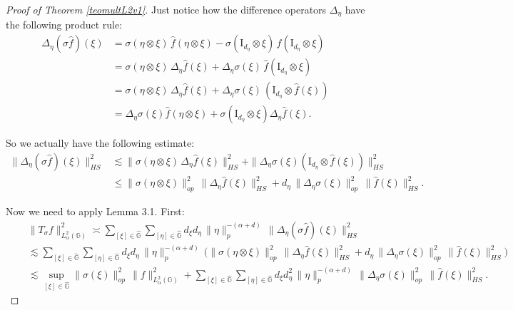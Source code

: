 \documentclass[12pt, reqno]{amsart}
\newcommand{\1}{\mathds{1}}
\begin{document}
\begin{proof}[Proof of Theorem \ref{teomultL2v1}]
    Just notice how the difference operators $\Delta_\eta$ have the following product rule:
\begin{align*}
\Delta_\eta (\sigma\widehat{ f})(\xi) 
&= \sigma(\eta \otimes \xi)\,\hat{f}(\eta \otimes \xi) 
   - \sigma(\mathrm{I}_{d_\eta} \otimes \xi)\,\hat{f}(\mathrm{I}_{d_\eta} \otimes \xi) \\
&= \sigma(\eta \otimes \xi)\,\Delta_\eta \hat{f}(\xi) 
   + \Delta_\eta \sigma(\xi)\,\hat{f}(\mathrm{I}_{d_\eta} \otimes \xi) \\
&= \sigma(\eta \otimes \xi)\,\Delta_\eta \hat{f}(\xi) 
   + \Delta_\eta \sigma(\xi)\,(\mathrm{I}_{d_\eta} \otimes \hat{f}(\xi)) \\ &= \Delta_\eta \sigma (\xi) \widehat{f}(\eta \otimes \xi) + \sigma (\mathrm{I}_{d_\eta} \otimes \xi ) \Delta_\eta \widehat{f} (\xi ).
\end{align*}

So we actually have the following estimate:
\begin{align*}
\|\Delta_\eta (\sigma\widehat{ f})(\xi)\|^2_{HS} 
&\lesssim 
\|\sigma(\eta \otimes \xi)\,\Delta_\eta \hat{f}(\xi)\|^2_{HS} 
+ \|\Delta_\eta \sigma(\xi)(\mathrm{I}_{d_\eta} \otimes \hat{f}(\xi))\|^2_{HS} \\
&\leq \|\sigma(\eta \otimes \xi)\|^2_{op}\,\|\Delta_\eta \hat{f}(\xi)\|^2_{HS} 
+ d_\eta \,\|\Delta_\eta \sigma(\xi)\|^2_{op}\,\|\hat{f}(\xi)\|^2_{HS}.
\end{align*}

Now we need to apply Lemma 3.1. First:
\begin{align*}
\quad & \|T_\sigma f \|^2_{L^2_\alpha(\mathbb{G})} 
\asymp \sum_{[\xi]\in \widehat{\mathbb{G}}}
\sum_{[\eta]\in \widehat{\mathbb{G}}}
d_\xi d_\eta \,\|\eta\|_p^{-(\alpha+d)}\,
\|\Delta_\eta (\sigma \widehat{f})(\xi)\|^2_{HS} \\
&\lesssim \sum_{[\xi]\in \widehat{\mathbb{G}}}
\sum_{[\eta]\in \widehat{\mathbb{G}}}
d_\xi d_\eta \,\|\eta\|_p^{-(\alpha+d)}\,
\Big( \|\sigma(\eta \otimes \xi)\|^2_{op}\,\|\Delta_\eta \hat{f}(\xi)\|^2_{HS} 
+ d_\eta \,\|\Delta_\eta \sigma(\xi)\|^2_{op}\,\|\hat{f}(\xi)\|^2_{HS} \Big) \\
&\lesssim \sup_{[\xi]\in \widehat{\mathbb{G}}} \|\sigma(\xi)\|^2_{op}\,\|f\|^2_{L^2_\alpha(\mathbb{G})}
+ \sum_{[\xi]\in \widehat{\mathbb{G}}}
\sum_{[\eta]\in \widehat{\mathbb{G}}}
d_\xi d_\eta^2 \,\|\eta\|^{-(\alpha+d)}_p\,
\|\Delta_\eta \sigma(\xi)\|^2_{op}\,\|\hat{f}(\xi)\|^2_{HS}.
\end{align*}


\end{proof}
\end{document}
